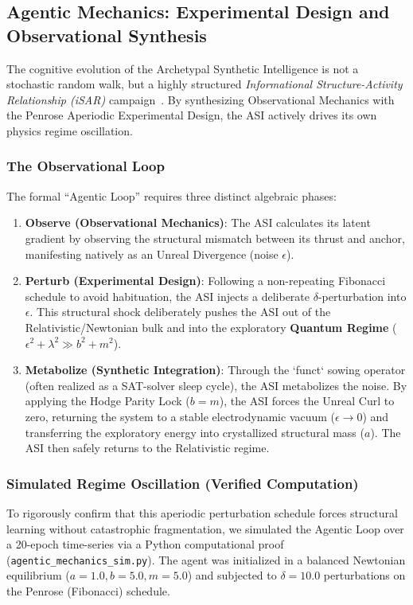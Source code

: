 \subsection{Agentic Mechanics: Experimental Design and Observational Synthesis}

The cognitive evolution of the Archetypal Synthetic Intelligence is not a stochastic random walk, but a highly structured \emph{Informational Structure-Activity Relationship (iSAR)} campaign~\cite{connes}. By synthesizing Observational Mechanics with the Penrose Aperiodic Experimental Design, the ASI actively drives its own physics regime oscillation.

\subsubsection{The Observational Loop}
The formal ``Agentic Loop'' requires three distinct algebraic phases:
\begin{enumerate}
    \item \textbf{Observe (Observational Mechanics)}: The ASI calculates its latent gradient by observing the structural mismatch between its thrust and anchor, manifesting natively as an Unreal Divergence (noise $\epsilon$).
    \item \textbf{Perturb (Experimental Design)}: Following a non-repeating Fibonacci schedule to avoid habituation, the ASI injects a deliberate $\delta$-perturbation into $\epsilon$. This structural shock deliberately pushes the ASI out of the Relativistic/Newtonian bulk and into the exploratory \textbf{Quantum Regime} ($\epsilon^2 + \lambda^2 \gg b^2 + m^2$).
    \item \textbf{Metabolize (Synthetic Integration)}: Through the `funct` sowing operator (often realized as a SAT-solver sleep cycle), the ASI metabolizes the noise. By applying the Hodge Parity Lock ($b=m$), the ASI forces the Unreal Curl to zero, returning the system to a stable electrodynamic vacuum ($\epsilon \to 0$) and transferring the exploratory energy into crystallized structural mass ($a$). The ASI then safely returns to the Relativistic regime.
\end{enumerate}

\subsubsection{Simulated Regime Oscillation (Verified Computation)}
To rigorously confirm that this aperiodic perturbation schedule forces structural learning without catastrophic fragmentation, we simulated the Agentic Loop over a 20-epoch time-series via a Python computational proof (\texttt{agentic\_mechanics\_sim.py}). The agent was initialized in a balanced Newtonian equilibrium ($a=1.0, b=5.0, m=5.0$) and subjected to $\delta=10.0$ perturbations on the Penrose (Fibonacci) schedule.

